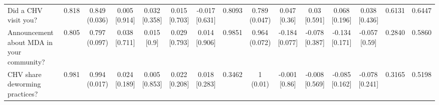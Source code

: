\documentclass[
]{article}
\begin{document}
\begin{table}[htbp]
{\begin{tabular}[t]{lcccccccccccccc}
\addlinespace[0.3em]
\hline
\multicolumn{15}{l}{\textit{\textbf{Panel D: Implementation, $N=2,659$}}}\\
\hline
\hspace{1em}Did a CHV visit you? & 0.818 & \makecell[c]{0.849\\(0.036)} & \makecell[c]{0.005\\{[0.914]}} & \makecell[c]{0.032\\{[0.358]}} & \makecell[c]{0.015\\{[0.703]}} & \makecell[c]{-0.017\\{[0.631]}} & 0.8093 & \makecell[c]{0.789\\(0.047)} & \makecell[c]{0.047\\{[0.36]}} & \makecell[c]{0.03\\{[0.591]}} & \makecell[c]{0.068\\{[0.196]}} & \makecell[c]{0.038\\{[0.436]}} & 0.6131 & 0.6447\\
\hspace{1em}Announcement about MDA in your community? & 0.805 & \makecell[c]{0.797\\(0.097)} & \makecell[c]{0.038\\{[0.711]}} & \makecell[c]{0.015\\{[0.9]}} & \makecell[c]{0.029\\{[0.793]}} & \makecell[c]{0.014\\{[0.906]}} & 0.9851 & \makecell[c]{0.964\\(0.072)} & \makecell[c]{-0.184\\{[0.077]}} & \makecell[c]{-0.078\\{[0.387]}} & \makecell[c]{-0.134\\{[0.171]}} & \makecell[c]{-0.057\\{[0.59]}} & 0.2840 & 0.5860\\
\hspace{1em}CHV share deworming practices? & 0.981 & \makecell[c]{0.994\\(0.017)} & \makecell[c]{0.024\\{[0.189]}} & \makecell[c]{0.005\\{[0.853]}} & \makecell[c]{0.022\\{[0.208]}} & \makecell[c]{0.018\\{[0.283]}} & 0.3462 & \makecell[c]{1\\(0.01)} & \makecell[c]{-0.001\\{[0.86]}} & \makecell[c]{-0.008\\{[0.569]}} & \makecell[c]{-0.085\\{[0.162]}} & \makecell[c]{-0.078\\{[0.241]}} & 0.3165 & 0.5198\\

\end{tabular}}
\end{table}
\end{document}
